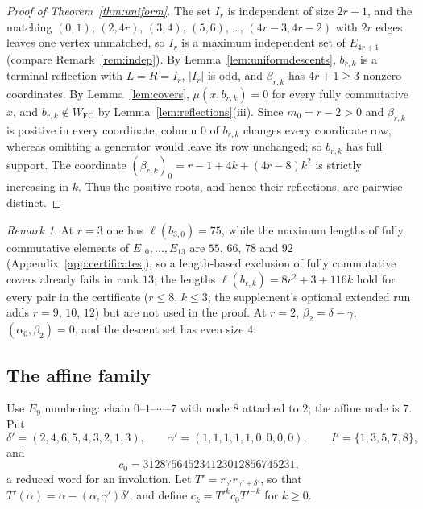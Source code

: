 \documentclass[10pt]{article}
\theoremstyle{remark}
\newtheorem{remark}[theorem]{Remark}
\newcommand{\FC}{W_{\mathrm{FC}}}
\begin{document}
\begin{proof}[Proof of Theorem~\ref{thm:uniform}]
The set $I_r$ is independent of size $2r+1$, and the matching
$(0,1)$, $(2,4r)$, $(3,4)$, $(5,6)$, \ldots, $(4r-3,4r-2)$ with $2r$ edges
leaves one vertex unmatched, so $I_r$ is a maximum independent set of
$E_{4r+1}$ (compare Remark~\ref{rem:indep}). By
Lemma~\ref{lem:uniformdescents}, $b_{r,k}$ is a terminal reflection with
$L=R=I_r$, $|I_r|$ is odd, and $\beta_{r,k}$ has $4r+1\geq3$ nonzero
coordinates. By Lemma~\ref{lem:covers}, $\mu(x,b_{r,k})=0$ for every
fully commutative $x$, and $b_{r,k}\notin\FC$ by
Lemma~\ref{lem:reflections}(iii). Since $m_0=r-2>0$ and $\beta_{r,k}$ is
positive in every coordinate, column $0$ of $b_{r,k}$ changes every
coordinate row, whereas omitting a generator would leave its row
unchanged; so $b_{r,k}$ has full support. The coordinate
$(\beta_{r,k})_0=r-1+4k+(4r-8)k^2$ is strictly increasing in $k$. Thus
the positive roots, and hence their reflections, are pairwise distinct.
\end{proof}

\begin{remark}\label{rem:uniformlengths}
At $r=3$ one has $\ell(b_{3,0})=75$, while the maximum lengths of fully commutative
elements of $E_{10},\ldots,E_{13}$ are $55$, $66$, $78$ and $92$
(Appendix~\ref{app:certificates}), so a length-based exclusion of fully
commutative covers already fails in rank $13$; the lengths
$\ell(b_{r,k})=8r^2+3+116k$ hold for every pair in the certificate ($r\leq8$,
$k\leq3$; the supplement's optional extended run adds $r=9$, $10$, $12$) but are not
used in the proof. At $r=2$,
$\beta_2=\delta-\gamma$, $(\alpha_0,\beta_2)=0$, and the descent set has
even size $4$.
\end{remark}

\subsection{The affine family}\label{sec:affine}
Use $E_9$ numbering: chain $0\text{--}1\text{--}\cdots\text{--}7$ with node $8$ attached to $2$;
the affine node is $7$. Put
\[
 \delta'=(2,4,6,5,4,3,2,1,3),\qquad
 \gamma'=(1,1,1,1,1,0,0,0,0),\qquad I'=\{1,3,5,7,8\},
\]
and
\[
 c_0=312875645234123012856745231,
\]
a reduced word for an involution. Let $T'=r_{\gamma'}r_{\gamma'+\delta'}$,
so that $T'(\alpha)=\alpha-(\alpha,\gamma')\delta'$, and define
$c_k=T'^kc_0T'^{-k}$ for $k\geq0$.
\end{document}
